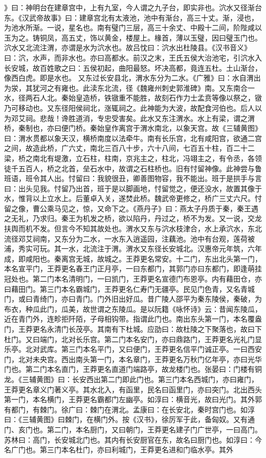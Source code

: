 \documentclass[12pt,UTF8]{ctexbook}
\begin{document}
》曰：神明台在建章宫中，上有九室，今人谓之九子台，即实非也。泬水又径渐台东。《汉武帝故事》曰：建章宫北有太液池，池中有渐台，高三十丈。渐，浸也，为池水所渐。一说，星名也。南有璧门三层，高三十余丈、中殿十二间，阶陛咸以玉为之。铸铜凤，高五丈，饰以黄金，楼屋上。椽首，薄以玉璧，因曰璧玉门也。泬水又北流注渭，亦谓是水为泬水也。故吕忱曰：泬水出杜陵县。《汉书音义》曰：泬，水声，而非水也。亦曰高都水。前汉之末，王氏五侯大治池宅，引泬水入长安城，故百姓歌之曰：五侯初起，曲阳最怒。坏决高都，竟连五杜。土山渐台，像西白虎。即是水也。
又东过长安县北，渭水东分为二水。《广雅》曰：水自渭出为泶，其犹河之有雍也。此渎东北流，径《魏雍州刺史郭淮碑》南。又东南合一水，径两石人北。秦始皇造桥，铁镦重不能胜，故刻石作力士孟贲等像以祭之，镦乃可移动也。又东径阳侯祠北，涨辄祠之。此神能为大波，故配食河伯也。后人以为邓艾祠。悲哉！谗胜道消，专忠受害矣。此水又东注渭水。水上有梁，谓之渭桥，秦制也，亦曰便门桥。秦始皇作离宫于渭水南北，以象天宫。故《三辅黄图》曰：渭水贯都以象天汉，横桥南度以法牵牛。南有长乐宫，北有咸阳宫，欲通二宫之间，故造此桥，广六丈，南北三百八十步，六十八间，七百五十柱，百二十二梁，桥之南北有堤激，立石柱，柱南，京兆主之，柱北，冯翊主之，有令丞，各领徒千五百人，桥之北首，垒石水中，故谓之石柱桥也。旧有忖留神像。此神尝与鲁班语，班令其人出。忖留曰：我貌很丑，卿善图物容，我不能出。班于是拱手与言曰：出头见我。忖留乃出首，班于是以脚画地，忖留觉之，便还没水，故置其像于水，惟背以上立水上。后董卓入关，遂焚此桥。魏武帝更修之，桥广三丈六尺。忖留之像，曹公乘马见之，惊，又命下之。《燕丹子》曰：燕太子丹质于秦，秦王遇之无礼，乃求归。秦王为机发之桥，欲以陷丹，丹过之，桥不为发。又一说，交龙扶舆而机不发。但言今不知其故处也。渭水又东与泬水枝津合，水上承泬水，东北流径邓艾祠南，又东分为二水，一水东入逍遥园，注藕池。池中有台观，莲荷被浦，秀实可玩。其一水，北流注于渭。渭水又东径长安城北。汉惠帝元年筑，六年成，即咸阳也。秦离宫无城，故城之。王莽更名常安。十二门，东出北头第一门，本名宣平门，王莽更名春王门正月亭，一曰东都门，其郭门亦曰东都门，即逢萌挂冠处也。第二门本名清明门，一曰凯门，王莽更名宣德门布恩亭。内有藉田仓，亦曰藉田门。第三门本名霸城门，王莽更名仁寿门无疆亭。民见门色青，又名青城门，或曰青绮门，亦曰青门。门外旧出好瓜。昔广陵人邵平为秦东陵侯，秦破，为布衣，种瓜此门，瓜美，故世谓之东陵瓜。是以阮籍《咏怀诗》云：昔闻东陵瓜，近在青门外，连畛拒阡陌，子母相钩带。指谓此门也。南出东头第一门，本名覆盎门，王莽更名永清门长茂亭。其南有下杜城。应劭曰：故杜陵之下聚落也，故曰下杜门。又曰端门，北对长乐宫。第二门本名安门，亦曰鼎路门，王莽更名光礼门显乐亭。北对武库。第三门本名平门，又曰便门，王莽更名信平门诚正亭。一曰西安门，北对未央宫。西出南头第一门，本名章门，王莽更名万秋门亿年亭，亦曰光华门也。第二门本名直门，王莽更名直道门端路亭，故龙楼门也。张晏曰：门楼有铜龙。《三辅黄图》曰：长安西出第二门即此门也。第三门本名西城门，亦曰雍门，王莽更名章义门著义亭。其水北入，有函里，民名曰函里门，亦曰突门。北出西头第一门，本名横门，王莽更名霸都门左幽亭。如淳曰：横音光，故曰光门。其外郭有都门，有棘门。徐广曰：棘门在渭北。孟康曰：在长安北，秦时宫门也。如淳曰：《三辅黄图》曰棘门，在横门外。按《汉书》，徐厉军于此，备匈奴。又有通门、亥门也。第二门，本名厨门，又曰朝门，王莽更名建子门广世亭，一曰高门。苏林曰：高门，长安城北门也。其内有长安厨官在东，故名曰厨门也。如淳曰：今名广门也。第三门本名杜门，亦曰利城门，王莽更名进和门临水亭。其外
\end{document}
